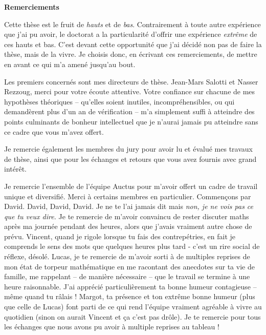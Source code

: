 \setcounter{page}{1}
\pagestyle{plain}
\begin{center}
    \textbf{Remerciements}
\end{center}
Cette thèse est le fruit de \emph{hauts} et de \emph{bas}. Contrairement à toute autre expérience que j'ai pu avoir, le doctorat a la particularité d'offrir une expérience \emph{extrême} de ces hauts et bas.
C'est devant cette opportunité que j'ai décidé non pas de faire la thèse, mais de la vivre. 
Je choisis donc, en écrivant ces remerciements, de mettre en avant ce qui m'a amené jusqu'au bout.

Les premiers concernés sont mes directeurs de thèse. Jean-Mars Salotti et Nasser Rezzoug, merci
pour votre écoute attentive. Votre confiance sur chacune de mes hypothèses théoriques -- qu'elles soient inutiles, incompréhensibles, ou qui demandèrent plus d'un an de vérification -- m'a 
simplement suffi à atteindre des points culminants de bonheur intellectuel que je n'aurai jamais pu atteindre sans ce cadre que vous m'avez offert.

Je remercie également les membres du jury pour avoir lu et évalué mes travaux de thèse, ainsi que pour les échanges et retours que vous avez fournis avec grand intérêt.

Je remercie l'ensemble de l'équipe Auctus pour m'avoir offert un cadre de travail unique et diversifié. Merci à certains membres en particulier. Commençons par David. David, David, David. Je ne te l'ai jamais dit mais \emph{non, je ne vois pas ce que tu veux dire.}
Je te remercie de m'avoir convaincu de rester discuter maths après ma journée pendant des heures, alors que j'avais vraiment autre chose de prévu. 
Vincent, quand je rigole lorsque tu fais des contrepétries, en fait je comprends le sens des mots que quelques heures plus tard - c'est un rire social de réflexe, désolé.
Lucas, je te remercie de m'avoir sorti à de multiples reprises de mon état de torpeur mathématique en me racontant des anecdotes sur ta vie de famille, me rappelant -- de manière nécessaire -- que 
le travail se termine à une heure raisonnable. J'ai apprécié particulièrement ta bonne humeur contagieuse -- même quand tu râlais !
Margot, ta présence et ton extrême bonne humeur (plus que celle de Lucas) font parti de ce qui rend l'équipe vraiment agréable à vivre au quotidien (sinon on aurait Vincent et ça c'est pas drôle). 
Je te remercie pour tous les échanges que nous avons pu avoir à multiple reprises au tableau ! 

